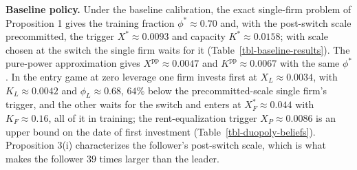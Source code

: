 \documentclass[
  11pt,
  letterpaper,
]{scrartcl}
\begin{document}
\textbf{Baseline policy.} Under the baseline calibration, the exact
single-firm problem of Proposition 1 gives the training fraction
\(\phi^* \approx 0.70\) and, with the post-switch scale precommitted,
the trigger \(X^* \approx 0.0093\) and capacity \(K^* \approx 0.0158\);
with scale chosen at the switch the single firm waits for it
(Table~\ref{tbl-baseline-results}). The pure-power approximation gives
\(X^{\text{pp}} \approx 0.0047\) and \(K^{\text{pp}} \approx 0.0067\)
with the same \(\phi^*\). In the entry game at zero leverage one firm
invests first at \(X_L \approx 0.0034\), with \(K_L \approx 0.0042\) and
\(\phi_L \approx 0.68\), \(64\%\) below the precommitted-scale single
firm's trigger, and the other waits for the switch and enters at
\(X_F^* \approx 0.044\) with \(K_F \approx 0.16\), all of it in
training; the rent-equalization trigger \(X_P \approx 0.0086\) is an
upper bound on the date of first investment
(Table~\ref{tbl-duopoly-beliefs}). Proposition 3(i) characterizes the
follower's post-switch scale, which is what makes the follower \(39\)
times larger than the leader.
\end{document}
